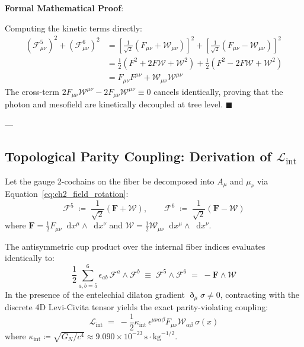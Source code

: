 \documentclass[
    12pt,
    a4paper,
    headings=normal,
    twoside=false,
    open=any,
    parskip=half
]{scrbook}
\newcommand{\ethop}{\eth}
\newcommand{\diff}{\mathop{}\!\mathrm{d}}
\newenvironment{myproof}[1][]{%
  \par\vspace{6pt}\noindent\textbf{\sffamily\color{maincolor}Formal Mathematical Proof\ifstrempty{#1}{}{ (#1)}}:\par\nopagebreak
}{%
  \penalty50\hfill\ensuremath{\blacksquare}\par\vspace{6pt}
}
\begin{document}
\begin{myproof}
Computing the kinetic terms directly:
\begin{align*}
\left( \mathcal{F}_{\mu\nu}^5 \right)^2 + \left( \mathcal{F}_{\mu\nu}^6 \right)^2 &= \left[ \frac{1}{\sqrt{2}}\left( F_{\mu\nu} + \mathcal{W}_{\mu\nu} \right) \right]^2 + \left[ \frac{1}{\sqrt{2}}\left( F_{\mu\nu} - \mathcal{W}_{\mu\nu} \right) \right]^2 \\
&= \frac{1}{2}\left( F^2 + 2F\mathcal{W} + \mathcal{W}^2 \right) + \frac{1}{2}\left( F^2 - 2F\mathcal{W} + \mathcal{W}^2 \right) \\
&= F_{\mu\nu} F^{\mu\nu} + \mathcal{W}_{\mu\nu} \mathcal{W}^{\mu\nu}
\end{align*}
The cross-term $2 F_{\mu\nu}\mathcal{W}^{\mu\nu} - 2 F_{\mu\nu}\mathcal{W}^{\mu\nu} \equiv 0$ cancels identically, proving that the photon and mesofield are kinetically decoupled at tree level.
\end{myproof}

---

\subsection{Topological Parity Coupling: Derivation of $\mathcal{L}_{\text{int}}$}

\begin{phystheorem}\label{thm:ch2_fiber_wedge_decomposition}
Let the gauge 2-cochains on the fiber be decomposed into $A_\mu$ and $\mu_\nu$ via Equation~\eqref{eq:ch2_field_rotation}:
\begin{equation*}
\mathcal{F}^5 \;\coloneqq\; \frac{1}{\sqrt{2}}\left( \mathbf{F} + \boldsymbol{\mathcal{W}} \right), \qquad \mathcal{F}^6 \;\coloneqq\; \frac{1}{\sqrt{2}}\left( \mathbf{F} - \boldsymbol{\mathcal{W}} \right)
\end{equation*}
where $\mathbf{F} = \frac{1}{2}F_{\mu\nu} \diff x^\mu \wedge \diff x^\nu$ and $\boldsymbol{\mathcal{W}} = \frac{1}{2}\mathcal{W}_{\mu\nu} \diff x^\mu \wedge \diff x^\nu$. 

The antisymmetric cup product over the internal fiber indices evaluates identically to:
\begin{equation}
\boxed{\frac{1}{2} \sum_{a,b=5}^6 \epsilon_{ab} \, \mathcal{F}^a \wedge \mathcal{F}^b \;\equiv\; \mathcal{F}^5 \wedge \mathcal{F}^6 \;=\; -\mathbf{F} \wedge \boldsymbol{\mathcal{W}}}
\label{eq:ch2_wedge_cross_term_identity}
\end{equation}
In the presence of the entelechial dilaton gradient $\ethop_\mu\sigma \ne 0$, contracting with the discrete 4D Levi-Civita tensor yields the exact parity-violating coupling:
\begin{equation}
\boxed{\mathcal{L}_{\text{int}} \;=\; -\frac{1}{2}\kappa_{\text{int}} \, \epsilon^{\mu\nu\alpha\beta} F_{\mu\nu} \mathcal{W}_{\alpha\beta} \, \sigma(x)}
\label{eq:ch2_derived_interaction_lagrangian}
\end{equation}
where $\kappa_{\text{int}} \coloneqq \sqrt{G_N / c^4} \approx 9.090 \times 10^{-23}\,\text{s}\cdot\text{kg}^{-1/2}$.
\end{phystheorem}
\end{document}
